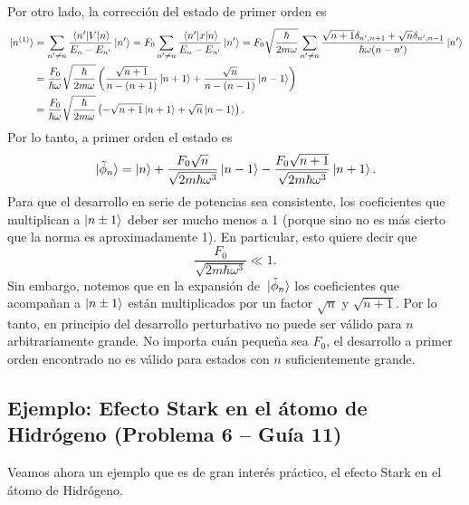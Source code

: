 \documentclass[10pt, a4paper]{article}
\numberwithin{equation}{subsection}
\begin{document}
Por otro lado, la corrección del estado de primer orden es
\begin{align}
  \ket*{n^{(1)}}
  &= \sum_{n' \neq n} \frac{\matrixel{n'}{V}{n}}{E_n - E_{n'}}\ket{n'}
  = F_0\sum_{n' \neq n} \frac{\matrixel{n'}{x}{n}}{E_n - E_{n'}}\ket{n'}
  = F_0\sqrt{\frac{\hbar}{2m\omega}} \sum_{n' \neq n}
    \frac{\sqrt{n+1}\delta_{n',n+1} + \sqrt{n}\delta_{n',n-1}}
    {\hbar\omega(n - n')} \ket{n'} \nonumber \\
  &= \frac{F_0}{\hbar\omega}\sqrt{\frac{\hbar}{2m\omega}} \left(
    \frac{\sqrt{n+1}}{n - (n+1)}\ket{n+1} +
    \frac{\sqrt{n}}{n - (n-1)}\ket{n-1} \right) \nonumber \\
  &= \frac{F_0}{\hbar\omega}\sqrt{\frac{\hbar}{2m\omega}} \left(
    -\sqrt{n+1}\ket{n+1} + \sqrt{n}\ket{n-1} \right).
\end{align}
Por lo tanto, a primer orden el estado es
\begin{equation}
  \ket*{\tilde{\phi}_n} = \ket{n} +
  \frac{F_0\sqrt{n}}{\sqrt{2m\hbar\omega^3}}\ket{n-1} -
  \frac{F_0\sqrt{n+1}}{\sqrt{2m\hbar\omega^3}}\ket{n+1}.
\end{equation}
Para que el desarrollo en serie de potencias sea consistente, los coeficientes
que multiplican a $\ket{n\pm1}$ deber ser mucho menos a 1 (porque sino no es
más cierto que la norma es aproximadamente 1). En particular, esto quiere decir
que
\begin{equation}
  \frac{F_0}{\sqrt{2m\hbar\omega^3}} \ll 1.
\end{equation}
Sin embargo, notemos que en la expansión de $\ket*{\tilde{\phi}_n}$ los
coeficientes que acompañan a $\ket{n\pm1}$ están multiplicados por un factor
$\sqrt{n}$ y $\sqrt{n+1}$. Por lo tanto, en principio del desarrollo
perturbativo no puede ser válido para $n$ arbitrariamente grande. No importa
cuán pequeña sea $F_0$, el desarrollo a primer orden encontrado no es válido
para estados con $n$ suficientemente grande.

\subsection{Ejemplo: Efecto Stark en el átomo de Hidrógeno
  (Problema 6 -- Guía 11)}

Veamos ahora un ejemplo que es de gran interés práctico, el efecto Stark en el
átomo de Hidrógeno.

\bigbreak
\end{document}
